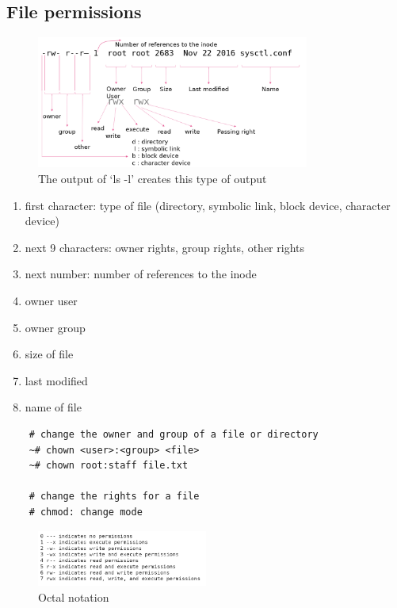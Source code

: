 \documentclass{article}
\begin{document}
\subsection{File permissions}

\begin{figure}[H]
    \centering
    \includegraphics[width=0.8\textwidth]{file-permissions.png}
    \caption{The output of `ls -l' creates this type of output}
\end{figure}

\begin{enumerate}
    \item first character: type of file (directory, symbolic link, block device, character device)
    \item next 9 characters: owner rights, group rights, other rights
    \item next number: number of references to the inode
    \item owner user
    \item owner group
    \item size of file
    \item last modified
    \item name of file
\end{enumerate}

\begin{verbatim}
    # change the owner and group of a file or directory
    ~# chown <user>:<group> <file>
    ~# chown root:staff file.txt
    
    # change the rights for a file
    # chmod: change mode
\end{verbatim}

\begin{figure}[H]
    \centering
    \includegraphics[width=0.5\textwidth]{octal-notation.png}
    \caption{Octal notation}
\end{figure}
\end{document}

